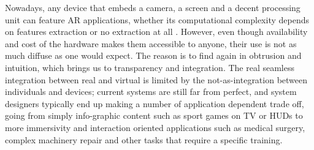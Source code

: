 Nowadays, any device that embeds a camera, a screen and a decent processing unit can feature AR applications, whether its computational complexity depends on features extraction \cite{link_google_translate_AR} or no extraction at all \cite{link_IKEA_AR}. However, even though availability and cost of the hardware makes them accessible to anyone, their use is not as much diffuse as one would expect. The reason is to find again in obtrusion and intuition, which brings us to transparency and integration. The real seamless integration between real and virtual is limited by the not-as-integration between individuals and devices; current systems are still far from perfect, and system designers typically end up making a number of application dependent trade off, going from simply info-graphic content such as sport games on TV or HUDs to more immersivity and interaction oriented applications such as medical surgery, complex machinery repair and other tasks that require a specific training.

